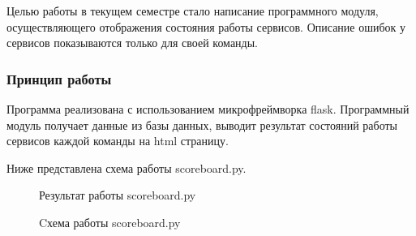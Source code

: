 Целью работы в текущем семестре стало написание программного модуля, осуществляющего отображения состояния работы сервисов. Описание ошибок у сервисов показываются только для своей команды.

\subsubsection{Принцип работы}

Программа реализована с использованием микрофреймворка flask. Программный модуль получает данные из базы данных, выводит результат состояний работы сервисов каждой команды на html страницу.

Ниже представлена схема работы scoreboard.py.

\begin{figure}[ht!]
\caption{Результат работы scoreboard.py}
\end{figure}

\begin{figure}[ht!]
\caption{Cхема работы scoreboard.py}
\end{figure}


\clearpage
